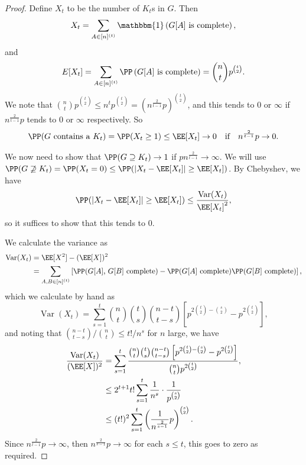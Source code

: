 \begin{proof}
	Define $X_t$ to be the number of $K_t$s in $G$. Then
	$$
	X_t = \sum_{A \in [n]^{(t)}} \mathbbm{1}\left(G[A] \text{ is complete}\right),
	$$
	and
	$$
	E[X_t] = \sum_{A \in [n]^{(t)}} \PP\left(G[A] \text{ is complete}\right) = \binom{n}{t}p^{\binom{t}{2}}.
	$$
	We note that $\binom{n}{t}p^{\binom{t}{2}} \leq n^t p^{\binom{t}{2}} =\left(n^{\frac{2}{t - 1}}p\right)^{\binom{t}{2}}$, and this tends to 0 or $\infty$ if $n^{\frac{2}{t - 1}}p$ tends to $0$ or $\infty$ respectively.
	So
	$$
\PP(\text{$G$ contains a $K_t$}) = \PP(X_t \geq 1)\leq \EE[X_t] \rightarrow 0 \quad \text{if} \quad n^{\frac{2}{t - 1}}p \rightarrow 0.
	$$

	We now need to show that $\PP(G \supseteq K_t) \rightarrow 1$ if $pn^{\frac{2}{t - 1}} \rightarrow \infty$. We will use $\PP(G \not \supseteq K_t) = \PP(X_t = 0) \leq \PP(|X_t - \EE[X_t]| \geq \EE[X_t])$. By Chebyshev, we have
	$$
	\PP(|X_t - \EE[X_t]| \geq \EE[X_t]) \leq \frac{\operatorname{Var}(X_t)}{\EE[X_t]^2},
	$$
	so it suffices to show that this tends to 0.

	We calculate the variance as
	\begin{align*}
		\operatorname{Var}(X_t) &= \EE[X^2] - (\EE[X])^2 \\
		&= \sum_{A, B \in [n]^{(t)}} \left[\PP(\text{$G[A]$, $G[B]$ complete}) - \PP(\text{$G[A]$ complete}) \PP(\text{$G[B]$ complete})\right],
	\end{align*}
	which we calculate by hand as
	$$
	\operatorname{Var}(X_t) = \sum_{s = 1}^t \binom{n}{t}\binom{t}{s} \binom{n - t}{t - s}\left[p^{2\binom{t}{2} - \binom{s}{2}} - p^{2 \binom{t}{2}}\right],
	$$
	and noting that $\binom{n - t}{t - s} / \binom{n}{t} \leq t!/n^s$ for $n$ large, we have
\begin{align*}
	\frac{\operatorname{Var}(X_t)}{(\EE[X])^2} &= \sum_{s = 1}^t \frac{\binom{n}{t}\binom{t}{s} \binom{n - t}{t - s}\left[p^{2\binom{t}{2} - \binom{s}{2}} - p^{2 \binom{t}{2}}\right]}{\binom{n}{t} p^{2\binom{t}{2}}}, \\
	&\leq 2^{t+1} t! \sum_{s = 1}^t \frac{1}{n^s}\cdot \frac{1}{p^{\binom{s}{2}}} \\
	&\leq (t!)^2 \sum_{s = 1}^t  \left(\frac{1}{n^{\frac{2}{s - 1}}}p\right)^{\binom{s}{2}}.
\end{align*}
Since $n^{\frac{2}{t - 1}}p \rightarrow \infty$, then $n^{\frac{2}{s - 1}}p \rightarrow \infty$ for each $s \leq t$, this goes to zero as required.
\end{proof}

